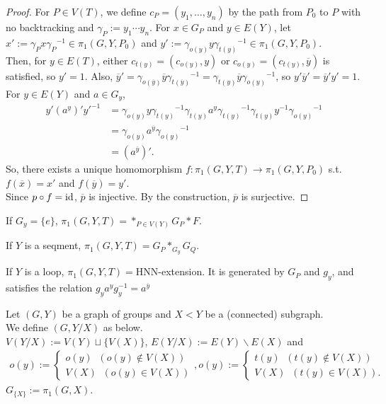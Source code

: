 \begin{proof}
  For $P \in V(T)$, we define $c_P = (y_1, \ldots, y_n)$ by the path from $P_0$ to $P$ with no backtracking
  and $\gamma_P := y_1 \cdots y_n$.
  For $x \in G_P$ and $y\in E(Y)$, let $x' := \gamma_P x {\gamma_P}^{-1} \in \pi_1(G,Y,P_0)$ and
  $y' := \gamma_{o(y)}y{\gamma_{t(y)}}^{-1} \in \pi_1(G,Y,P_0)$. \\
  Then, for $y \in E(T)$, either $c_{t(y)} = (c_{o(y)},y)$ or $c_{o(y)} = (c_{t(y)},\overline{y})$ is satisfied, so $y' =1$.
  Also, $\overline{y}' = \gamma_{o(\overline{y})}\overline{y}{\gamma_{t(\overline{y})}}^{-1} = \gamma_{t(y)}\overline{y}{\gamma_{o(y)}}^{-1}$,
  so $y'\overline{y}' = \overline{y}'y' =1$.
  For $y \in E(Y)$ and $a \in G_y$,
  \begin{align*}
    y' (a^y)'{y'}^{-1}
    &= \gamma_{o(y)} y {\gamma_{t(y)}}^{-1} \gamma_{t(y)} a^y {\gamma_{t(y)}}^{-1}  \gamma_{t(y)} y^{-1} {\gamma_{o(y)}}^{-1} \\
    &=  \gamma_{o(y)} a^{\overline{y}} {\gamma_{o(y)}}^{-1} \\
    &= (a^{\overline{y}})'.
  \end{align*}
  So, there exists a unique homomorphism $f: \pi_1(G,Y,T) \rightarrow \pi_1(G,Y,P_0)$ s.t. $f(\overline{x})= x'$ and $f(\overline{y}) = y'$. \\
  Since $p\circ f = {\rm id}$, $\overline{p}$ is injective.
  By the construction, $\overline{p}$ is surjective.   
\end{proof}
  

\begin{example}
  If $G_y = \{e\}$, $\pi_1(G,Y,T) = \ast_{P \in V(Y)}G_P \ast F$.
\end{example}

\begin{example}
  If $Y$ is a seqment, $\pi_1(G,Y,T) = G_P \ast_{G_y} G_Q$.
\end{example}

\begin{example}
  If $Y$ is a loop, $\pi_1(G,Y,T) = $HNN-extension.
  It is generated by $G_P$ and $g_y$, and satisfies the relation $g_y a^y g_y^{-1} = a^{\overline{y}}$
\end{example}

\begin{definition}
  Let $(G,Y)$ be a graph of groups and $X < Y$ be a (connected) subgraph. \\
  We define $(G,Y/X)$ as below. \\
  $V(Y/X) := V(Y) \sqcup \{V(X)\}$, $E(Y/X) := E(Y) \backslash E(X)$ and
  \begin{align*}
  o(y) := \left\{\begin{gathered} o(y)\;\;  (o(y) \notin V(X))\\
   V(X) \;\; (o(y) \in V(X)) \end{gathered} \right.
  , o(y) := \left\{\begin{gathered} t(y)\;\;  (t(y) \notin V(X))\\
   V(X) \;\; (t(y) \in V(X)). \end{gathered} \right.
  \end{align*}
  $G_{\{X\}}:= \pi_1(G,X)$.
\end{definition}

